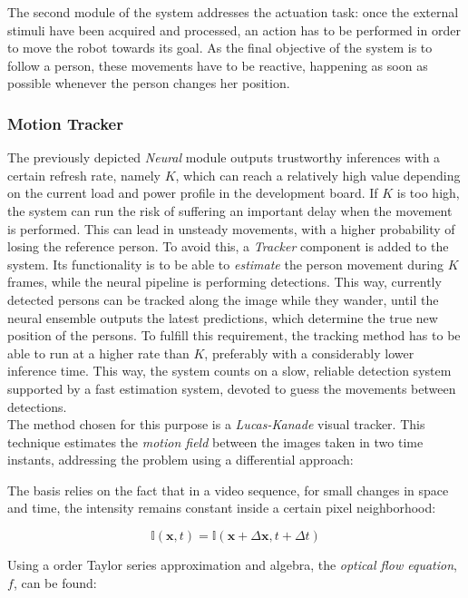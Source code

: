 The second module of the system addresses the actuation task: once the external stimuli have been acquired and processed, an action has to be performed in order to move the robot towards its goal. As the final objective of the system is to follow a person, these movements have to be reactive, happening as soon as possible whenever the person changes her position.\\

\subsubsection{Motion Tracker}

The previously depicted \textit{Neural} module outputs trustworthy inferences with a certain refresh rate, namely $K$, which can reach a relatively high value depending on the current load and power profile in the development board. If $K$ is too high, the system can run the risk of suffering an important delay when the movement is performed. This can lead in unsteady movements, with a higher probability of losing the reference person. To avoid this, a \textit{Tracker} component is added to the system. Its functionality is to be able to \textit{estimate} the person movement during $K$ frames, while the neural pipeline is performing detections. This way, currently detected persons can be tracked along the image while they wander, until the neural ensemble outputs the latest predictions, which determine the true new position of the persons. To fulfill this requirement, the tracking method has to be able to run at a higher rate than $K$, preferably with a considerably lower inference time. This way, the system counts on a slow, reliable detection system supported by a fast estimation system, devoted to guess the movements between detections.\\

The method chosen for this purpose is a \textit{Lucas-Kanade} visual tracker\cite{diapos_cv_motion_estimation}.  This technique estimates the \textit{motion field} between the images taken in two time instants, addressing the problem using a differential approach\cite{lucas_kanade}:

The basis relies on the fact that in a video sequence, for small changes in space and time, the intensity remains constant inside a certain pixel neighborhood:

$$
\mathbb{I}(\mathbf{x}, t) = \mathbb{I}(\mathbf{x} + \Delta \textbf{x}, t + \Delta t)
$$

Using a  order Taylor series approximation and algebra, the \textit{optical flow equation}, $f$, can be found\cite{lucas_kanade_tutorial}:

